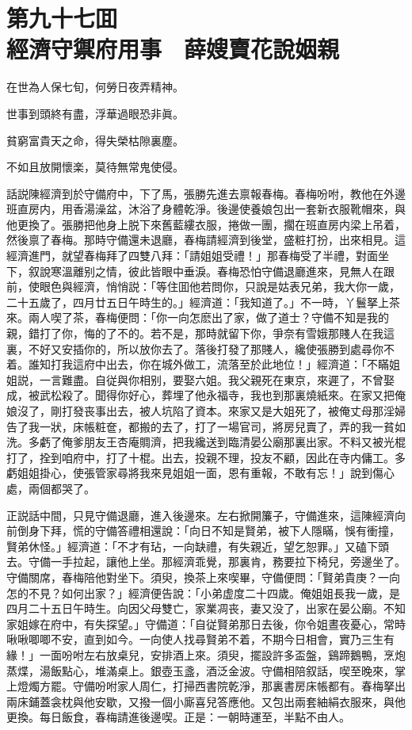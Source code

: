 
\chapter*{第九十七囬　\\經濟守禦府用事　薛嫂賣花說姻親}


\begin{myquote}
在世為人保七旬，何勞日夜弄精神。

世事到頭終有盡，浮華過眼恐非眞。

貧窮富貴天之命，得失榮枯隙裏塵。

不如且放開懷楽，莫待無常鬼使侵。
\end{myquote}

話説陳經濟到於守備府中，下了馬，張勝先進去禀報春梅。春梅吩咐，教他在外邊班直房内，用香湯澡盆，沐浴了身體乾淨。後邊使養娘包出一套新衣服靴帽來，與他更換了。張勝把他身上脱下來舊藍縷衣服，捲做一團，擱在班直房内梁上吊着，然後禀了春梅。那時守備還未退廳，春梅請經濟到後堂，盛粧打扮，出來相見。這經濟進門，就望春梅拜了四雙八拜：「請姐姐受禮！」那春梅受了半禮，對面坐下，叙說寒溫離别之情，彼此皆眼中垂淚。春梅恐怕守備退廳進來，見無人在跟前，使眼色與經濟，悄悄説：「等住囬他若問你，只說是姑表兄弟，我大你一歲，二十五歲了，四月廿五日午時生的。」經濟道：「我知道了。」不一時，丫鬟拏上茶來。兩人喫了茶，春梅便問：「你一向怎麽出了家，做了道士？守備不知是我的親，錯打了你，悔的了不的。若不是，那時就留下你，爭奈有雪娥那賤人在我這裏，不好又安插你的，所以放你去了。落後打發了那賤人，纔使張勝到處尋你不着。誰知打我這府中出去，你在城外做工，流落至於此地位！」經濟道：「不瞞姐姐説，一言難盡。自従與你相别，要娶六姐。我父親死在東京，來遲了，不曾娶成，被武松殺了。聞得你好心，葬埋了他永福寺，我也到那裏燒紙來。在家又把俺娘沒了，剛打發丧事出去，被人坑陷了資本。來家又是大姐死了，被俺丈母那淫婦告了我一狀，床帳粧奩，都搬的去了，打了一場官司，將房兒賣了，弄的我一貧如洗。多虧了俺爹朋友王杏庵賙濟，把我纔送到臨清晏公廟那裏出家。不料又被光棍打了，拴到咱府中，打了十棍。出去，投親不理，投友不顧，因此在寺内傭工。多虧姐姐掛心，使張管家尋將我來見姐姐一面，恩有重報，不敢有忘！」說到傷心處，兩個都哭了。

正説話中間，只見守備退廳，進入後邊來。左右掀開簾子，守備進來，這陳經濟向前倒身下拜，慌的守備答禮相還說：「向日不知是賢弟，被下人隱瞞，悞有衝撞，賢弟休怪。」經濟道：「不才有玷，一向缺禮，有失親近，望乞恕罪。」又磕下頭去。守備一手拉起，讓他上坐。那經濟乖覺，那裏肯，務要拉下椅兒，旁邊坐了。守備關席，春梅陪他對坐下。須臾，換茶上來喫畢，守備便問：「賢弟貴庚？一向怎的不見？如何出家？」經濟便告說：「小弟虚度二十四歲。俺姐姐長我一歲，是四月二十五日午時生。向因父母雙亡，家業凋丧，妻又没了，出家在晏公廟。不知家姐嫁在府中，有失探望。」守備道：「自従賢弟那日去後，你令姐晝夜憂心，常時啾啾唧唧不安，直到如今。一向使人找尋賢弟不着，不期今日相會，實乃三生有緣！」一面吩咐左右放桌兒，安排酒上來。須臾，擺設許多盃盤，鷄蹄鵝鴨，烹炮蒸煠，湯飯點心，堆滿桌上。銀壺玉盞，酒泛金波。守備相陪叙話，喫至晚來，掌上燈燭方罷。守備吩咐家人周仁，打掃西書院乾淨，那裏書房床帳都有。春梅拏出兩床鋪蓋衾枕與他安歇，又撥一個小廝喜兒答應他。又包出兩套紬絹衣服來，與他更換。每日飯食，春梅請進後邊喫。正是：一朝時運至，半點不由人。

